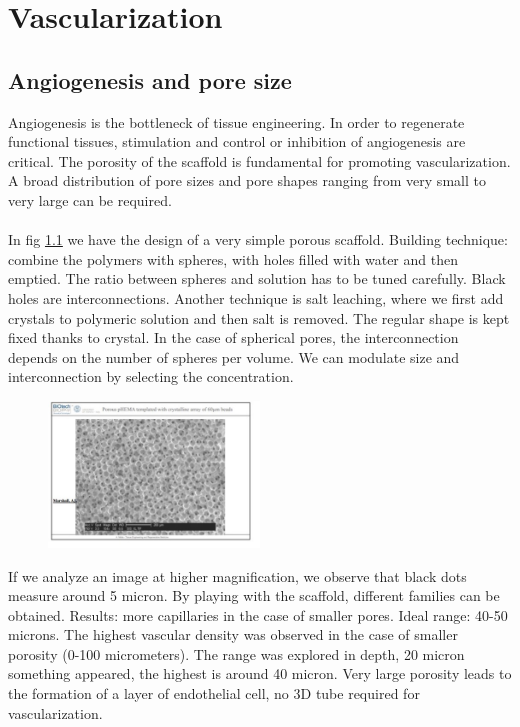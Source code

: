 \graphicspath{{chapters/09/images/}}
\chapter{Vascularization}

\section{Angiogenesis and pore size}
Angiogenesis is the bottleneck of tissue engineering.
In order to regenerate functional tissues, stimulation and control or inhibition of angiogenesis are critical.
The porosity of the scaffold is fundamental for promoting vascularization.
A broad distribution of pore sizes and pore shapes ranging from very small to very large can be required.
\\
\\
\noindent
In fig \ref{fig:pores} we have the design of a very simple porous scaffold.
Building technique: combine the polymers with spheres, with holes filled with water and then emptied.
The ratio between spheres and solution has to be tuned carefully.
Black holes are interconnections. Another technique is salt leaching, where we first add crystals to polymeric solution and then salt is removed.  The regular shape is kept fixed thanks to crystal.
In the case of spherical pores,  the interconnection depends on the number of spheres per volume. We can modulate size and interconnection by selecting the concentration.

\begin{figure}[h]
\centering
\includegraphics[width=0.5\textwidth]{pores}
\caption{\label{fig:pores}}
\end{figure}

If we analyze an image at higher magnification,  we observe that black dots measure around 5 micron.
By playing with the scaffold, different families can be obtained.
Results: more capillaries in the case of smaller pores. Ideal range: 40-50 microns.
The highest vascular density was observed in the case of smaller porosity (0-100 micrometers).
The range was explored in depth, 20 micron something appeared, the highest is around 40 micron. Very large porosity leads to the formation of a layer of endothelial cell, no 3D tube required for vascularization.

